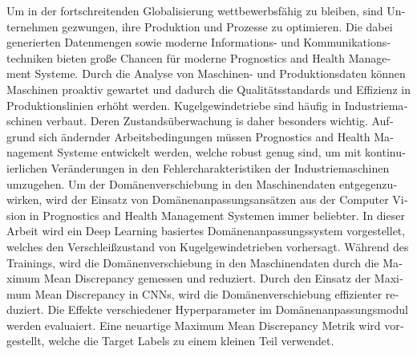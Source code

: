 \begin{otherlanguage}{ngerman} %
Um in der fortschreitenden Globalisierung wettbewerbsfähig zu bleiben, sind Unternehmen gezwungen, ihre Produktion und Prozesse zu optimieren. Die dabei generierten Datenmengen sowie moderne Informations- und Kommunikationstechniken bieten große Chancen für moderne Prognostics and Health Management Systeme. Durch die Analyse von Maschinen- und Produktionsdaten können Maschinen proaktiv gewartet und dadurch die Qualitätsstandards und Effizienz in Produktionslinien erhöht werden. Kugelgewindetriebe sind häufig in Industriemaschinen verbaut. Deren Zustandsüberwachung is daher besonders wichtig. Aufgrund sich ändernder Arbeitsbedingungen müssen Prognostics and Health Management Systeme entwickelt werden, welche robust genug sind, um mit kontinuierlichen Veränderungen in den Fehlercharakteristiken der Industriemaschinen umzugehen. Um der Domänenverschiebung in den Maschinendaten entgegenzuwirken, wird der Einsatz von Domänenanpassungsansätzen aus der Computer Vision in Prognostics and Health Management Systemen immer beliebter. In dieser Arbeit wird ein Deep Learning basiertes Domänenanpassungssystem vorgestellet, welches den Verschleißzustand von Kugelgewindetrieben vorhersagt. Während des Trainings, wird die Domänenverschiebung in den Maschinendaten durch die Maximum Mean Discrepancy gemessen und reduziert. Durch den Einsatz der Maximum Mean Discrepancy in CNNs, wird die Domänenverschiebung effizienter reduziert. Die Effekte verschiedener Hyperparameter im Domänenanpassungsmodul werden evaluaiert. Eine neuartige Maximum Mean Discrepancy Metrik wird vorgestellt, welche die Target Labels zu einem kleinen Teil verwendet.



\end{otherlanguage}


\makeatletter
{}
{\renewcommand{\abstractname}{Abstract}}
{\renewcommand{\abstractname}{Kurzfassung}}
\makeatother